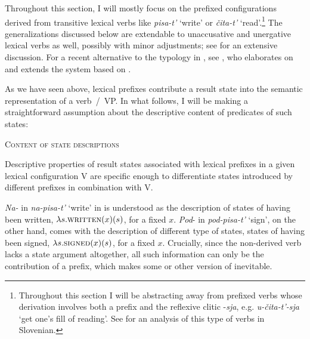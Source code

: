 \documentclass[output=paper,colorlinks,citecolor=brown]{langscibook}
\begin{document}
Throughout this section, I will mostly focus on the prefixed configurations derived from transitive lexical verbs like \textit{pisa-t’} ‘write’ or \textit{čita-t’} ‘read’.\footnote{Throughout this section I will be abstracting away from prefixed verbs whose derivation involves both a prefix and the reflexive clitic -\textit{sja}, e.g. \textit{u-čita-t’-sja} ‘get one’s fill of reading’. See \citet{Zaucer2009} for an analysis of this type of verbs in Slovenian.} The generalizations discussed below are extendable to unaccusative and unergative lexical verbs as well, possibly with minor adjustments; see \citet[70--122]{Romanova2007} for an extensive discussion. For a recent alternative to the typology in , see \citet[ch. 3]{Biskup2019}, who elaborates on and extends the system based on \citet{Bergsma.etal2010}. 

As we have seen above, lexical prefixes contribute a result state into the semantic representation of a verb~/~VP. In what follows, I will be making a straightforward assumption about the descriptive content of predicates of such states: 

\eanoraggedright   \textsc{Content of state descriptions}\label{tat:ex:64}

  Descriptive properties of result states associated with lexical prefixes in a given lexical configuration V are specific enough to differentiate states introduced by different prefixes in combination with V. 
\z

\noindent \textit{Na-} in \textit{na-pisa-t’} ‘write’ in  is understood as the description of states of having been written, $\lambda s.\textsc{written}(x)(s)$, for a fixed $x$. \textit{Pod}- in \textit{pod-pisa-t’} ‘sign’, on the other hand, comes with the description of different type of states, states of having been signed, $\lambda s.\textsc{signed}(x)(s)$, for a fixed $x$. Crucially, since the non-derived verb lacks a state argument altogether, all such information can only be the contribution of a prefix, which makes some or other version of  inevitable. 
\end{document}
